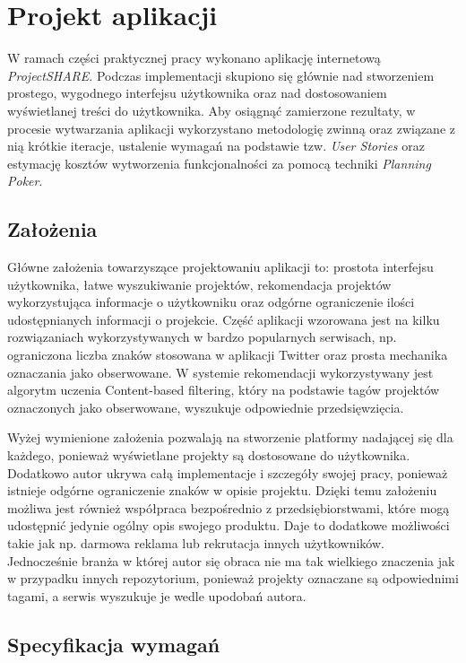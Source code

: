 \chapter{Projekt aplikacji}

W ramach części praktycznej pracy wykonano aplikację internetową \mbox{\textit{ProjectSHARE}}. Podczas implementacji skupiono się głównie nad stworzeniem prostego, wygodnego interfejsu użytkownika oraz nad dostosowaniem wyświetlanej treści do użytkownika. Aby osiągnąć zamierzone rezultaty, w procesie wytwarzania aplikacji wykorzystano metodologię zwinną oraz związane z nią krótkie iteracje, ustalenie wymagań na podstawie tzw. \textit{User Stories} oraz estymację kosztów wytworzenia funkcjonalności za pomocą techniki \textit{Planning Poker}.

\section{Założenia}

Główne założenia towarzyszące projektowaniu aplikacji to: prostota interfejsu
użytkownika, łatwe wyszukiwanie projektów, rekomendacja projektów wykorzystująca informacje o użytkowniku oraz odgórne
ograniczenie ilości udostępnianych informacji o projekcie. Część aplikacji wzorowana jest na kilku
rozwiązaniach wykorzystywanych w bardzo popularnych serwisach, np. ograniczona liczba
znaków stosowana w aplikacji Twitter oraz prosta mechanika oznaczania jako obserwowane. W systemie
rekomendacji wykorzystywany jest algorytm uczenia Content-based filtering, który na podstawie tagów projektów oznaczonych jako obserwowane, wyszukuje odpowiednie przedsięwzięcia.

Wyżej wymienione założenia pozwalają na stworzenie platformy nadającej się dla
każdego, ponieważ wyświetlane projekty są dostosowane do użytkownika. Dodatkowo autor ukrywa całą implementacje i szczegóły
swojej pracy, ponieważ istnieje odgórne ograniczenie znaków w opisie projektu. Dzięki temu
założeniu możliwa jest również współpraca bezpośrednio z przedsiębiorstwami, które mogą udostępnić
jedynie ogólny opis swojego produktu. Daje to dodatkowe możliwości takie jak np.
darmowa reklama lub rekrutacja innych użytkowników. Jednocześnie
branża w której autor się obraca nie ma tak wielkiego znaczenia jak w przypadku innych
repozytorium, ponieważ projekty oznaczane są odpowiednimi tagami, a serwis wyszukuje
je wedle upodobań autora.

\bigskip
\bigskip
\bigskip
\bigskip

\section{Specyfikacja wymagań}

